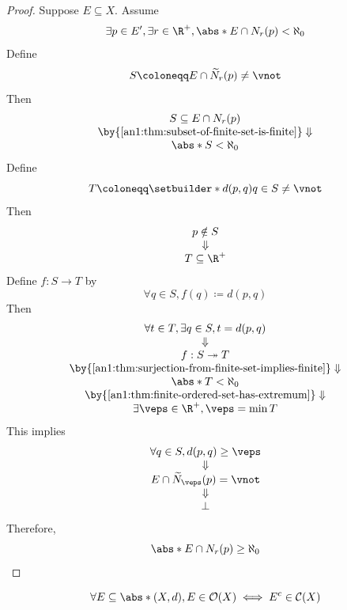 \begin{proof}
  Suppose $E \subseteq X$. Assume
  \[
    \exists p \in E', \exists r \in \R^{+}, \abs*{E \cap N_{r}(p)} < \aleph_{0}
  \]
  Define
  \[
    S \coloneqq E \cap \widetilde{N}_{r}(p) \neq \vnot
  \]
  Then
  \[
    \begin{array}{c}
      S \subseteq E \cap N_{r}(p)                                   \\
      \by{\Cref{an1:thm:subset-of-finite-set-is-finite}} \Downarrow \\
      \abs*{S} < \aleph_{0}
    \end{array}
  \]
  Define
  \[
    T \coloneqq \setbuilder*{d(p, q)}{q \in S} \neq \vnot
  \]
  Then
  \[
    \begin{array}{c}
      p \notin S \\
      \Downarrow \\
      T \subseteq \R^{+}
    \end{array}
  \]
  Define $f: S \to T$ by
  \[
    \forall q \in S, f(q) \coloneqq d(p, q)
  \]
  Then
  \[
    \begin{array}{c}
      \forall t \in T, \exists q \in S, t = d(p, q)                            \\
      \Downarrow                                                               \\
      f: S \twoheadrightarrow T                                                \\
      \by{\Cref{an1:thm:surjection-from-finite-set-implies-finite}} \Downarrow \\
      \abs*{T} < \aleph_{0}                                                    \\
      \by{\Cref{an1:thm:finite-ordered-set-has-extremum}} \Downarrow           \\
      \exists \veps \in \R^{+}, \veps = \min T
    \end{array}
  \]
  This implies
  \[
    \begin{array}{c}
      \forall q \in S, d(p, q) \geq \veps     \\
      \Downarrow                              \\
      E \cap \widetilde{N}_{\veps}(p) = \vnot \\
      \Downarrow                              \\
      \bot
    \end{array}
  \]
  Therefore,
  \[
    \abs*{E \cap N_{r}(p)} \geq \aleph_{0}
  \]
\end{proof}

\begin{theorem} \label{an1:thm:complement-of-open-set-is-closed}
  \[
    \forall E \subseteq \abs*{(X, d)}, E \in \mathcal{O}(X) \iff E^{c} \in \mathcal{C}(X)
  \]
\end{theorem}
